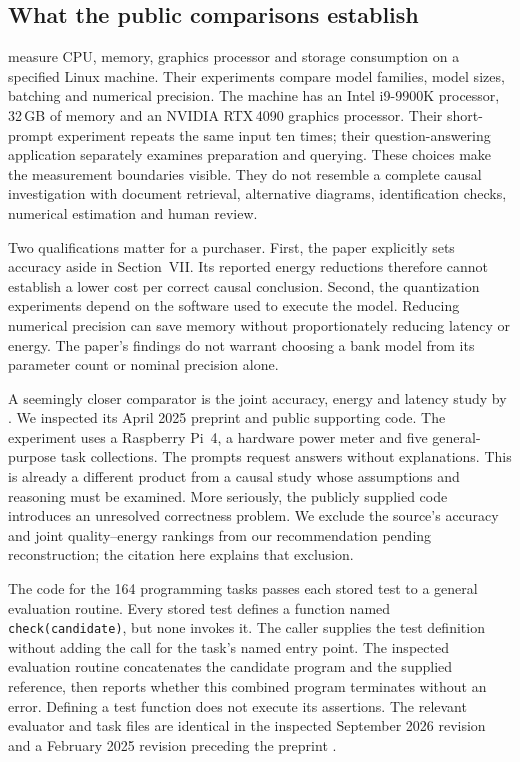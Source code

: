 \subsection{What the public comparisons establish}

\citet{closureArgerich2024} measure CPU, memory, graphics processor and
storage consumption on a specified Linux machine. Their experiments compare
model families, model sizes, batching and numerical precision. The machine
has an Intel i9-9900K processor, 32\,GB of memory and an NVIDIA RTX\,4090
graphics processor. Their short-prompt experiment repeats the same input ten
times; their question-answering application separately examines preparation
and querying. These choices make the measurement boundaries visible. They
do not resemble a complete causal investigation with document retrieval,
alternative diagrams, identification checks, numerical estimation and
human review.

Two qualifications matter for a purchaser. First, the paper explicitly sets
accuracy aside in Section~VII. Its reported energy reductions therefore
cannot establish a lower cost per correct causal conclusion. Second, the
quantization experiments depend on the software used to execute the model.
Reducing numerical precision can save memory without proportionately reducing
latency or energy. The paper's findings do not warrant choosing a bank model
from its parameter count or nominal precision alone.

A seemingly closer comparator is the joint accuracy, energy and latency
study by \citet{closureHusom2025}. We inspected its April 2025 preprint and
public supporting code. The experiment uses a Raspberry Pi~4, a hardware
power meter and five general-purpose task collections. The prompts request
answers without explanations. This is already a different product from a
causal study whose assumptions and reasoning must be examined. More seriously,
the publicly supplied code introduces an unresolved correctness problem.
We exclude the source's accuracy and joint quality--energy rankings from our
recommendation pending reconstruction; the citation here explains that
exclusion.

The code for the 164 programming tasks passes each stored test to a general
evaluation routine. Every stored test defines a function named
\texttt{check(candidate)}, but none invokes it. The caller supplies the test
definition without adding the call for the task's named entry point. The
inspected evaluation routine concatenates the candidate program and the
supplied reference, then reports whether this combined program terminates
without an error. Defining a test function does not execute its assertions.
The relevant evaluator and task files are identical in the inspected
September 2026 revision and a February 2025 revision preceding the preprint
\citep{closureEdgeCode2026,closureCodeEval2022}.

